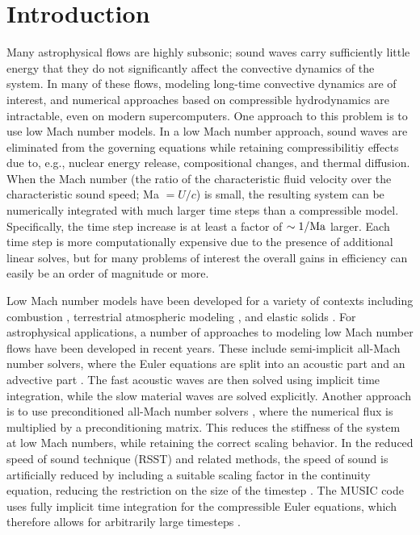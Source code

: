 \section{Introduction} \label{sec:intro}
Many astrophysical flows are highly subsonic; sound waves carry sufficiently little energy that they do not significantly affect the convective dynamics of the system.
In many of these flows, modeling long-time convective dynamics are of interest, and numerical approaches based on compressible hydrodynamics are intractable, even on modern supercomputers.
One approach to this problem is to use low Mach number models.
In a low Mach number approach, sound waves are eliminated from the governing equations while retaining compressibilitiy effects due to, e.g., nuclear energy release, compositional changes, and thermal diffusion.
When the Mach number (the ratio of the characteristic fluid velocity over the characteristic sound speed; Ma $= U/c$) is small,
the resulting system can be numerically integrated with much larger time steps than a compressible model.
Specifically, the time step increase is at least a factor of $\sim 1/{\rm Ma}$ larger.
Each time step is more computationally expensive due to the presence of additional linear solves,
but for many problems of interest the overall gains in efficiency can easily be an order of magnitude or more.

Low Mach number models have been developed for a variety of contexts including combustion \citep{day2000numerical}, terrestrial atmospheric modeling \citep{duarte2015low},
and elastic solids \citep{abbate2017all}.
For astrophysical applications, a number of approaches to modeling low Mach number flows have been developed in recent years.
These include semi-implicit all-Mach number solvers, where the Euler equations are split into an acoustic part and an advective part \citep{Kwatra2009,Degond2009,Cordier2012,Haack2012,Happenhofer2013,Chalons2016,Padioleau2019}.
The fast acoustic waves are then solved using implicit time integration, while the slow material waves are solved explicitly.
Another approach is to use preconditioned all-Mach number solvers \citep{Miczek2014,Barsukow2016}, where the numerical flux is multiplied by a preconditioning matrix.
This reduces the stiffness of the system at low Mach numbers, while retaining the correct scaling behavior. In the reduced speed of sound technique (RSST) and related methods, the speed of sound is artificially reduced by including a suitable scaling factor in the continuity equation, reducing the restriction on the size of the timestep \citep{Rempel2005,Hotta2012,Wang2015,Takeyama2017,Iijima2018}.
The MUSIC code uses fully implicit time integration for the compressible Euler equations, which therefore allows for arbitrarily large timesteps \citep{Viallet2011,Viallet2015,Goffrey2016}.

